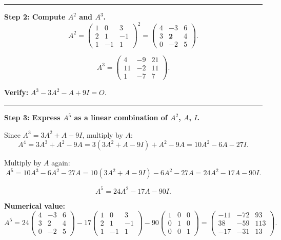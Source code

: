 \documentclass[12pt,a3paper]{article}
\begin{document}
\begin{tcolorbox}
\medskip\textcolor{cB}{\rule{\textwidth}{0.4pt}}

\textbf{Step 2: Compute $A^2$ and $A^3$.}
\[
  A^2 = \begin{pmatrix}1&0&3\\2&1&-1\\1&-1&1\end{pmatrix}^2
  = \begin{pmatrix}4&-3&6\\3&\mathbf{2}&4\\0&-2&5\end{pmatrix}.
\]

\[
  A^3 = \begin{pmatrix}4&-9&21\\11&-2&11\\1&-7&7\end{pmatrix}.
\]

\textbf{Verify:} $A^3-3A^2-A+9I=O$.\;\checkmark

\medskip\textcolor{cB}{\rule{\textwidth}{0.4pt}}

\textbf{Step 3: Express $A^5$ as a linear combination of $A^2$, $A$, $I$.}

Since $A^3 = 3A^2 + A - 9I$, multiply by $A$:
\[
  A^4 = 3A^3 + A^2 - 9A = 3(3A^2+A-9I)+A^2-9A = 10A^2-6A-27I.
\]

Multiply by $A$ again:
\[
  A^5 = 10A^3-6A^2-27A = 10(3A^2+A-9I)-6A^2-27A = 24A^2-17A-90I.
\]

\[
  \boxed{A^5 = 24A^2 - 17A - 90I.}
\]

\textbf{Numerical value:}
\[
  A^5 = 24\begin{pmatrix}4&-3&6\\3&2&4\\0&-2&5\end{pmatrix}
        -17\begin{pmatrix}1&0&3\\2&1&-1\\1&-1&1\end{pmatrix}
        -90\begin{pmatrix}1&0&0\\0&1&0\\0&0&1\end{pmatrix}
  = \begin{pmatrix}-11&-72&93\\38&-59&113\\-17&-31&13\end{pmatrix}.
\]

\end{tcolorbox}
\end{document}

